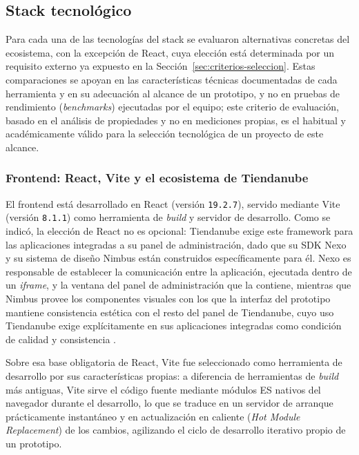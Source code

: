 \subsection{Stack tecnológico}
\label{sec:stack-tecnologico}

Para cada una de las tecnologías del stack se evaluaron alternativas concretas del ecosistema, con la excepción de React, cuya elección está determinada por un requisito externo ya expuesto en la Sección~\ref{sec:criterios-seleccion}. Estas comparaciones se apoyan en las características técnicas documentadas de cada herramienta y en su adecuación al alcance de un prototipo, y no en pruebas de rendimiento (\emph{benchmarks}) ejecutadas por el equipo; este criterio de evaluación, basado en el análisis de propiedades y no en mediciones propias, es el habitual y académicamente válido para la selección tecnológica de un proyecto de este alcance.

\subsubsection{Frontend: React, Vite y el ecosistema de Tiendanube}
\label{sec:frontend-react-vite}

El frontend está desarrollado en React (versión \texttt{19.2.7}), servido mediante Vite (versión \texttt{8.1.1}) como herramienta de \emph{build} y servidor de desarrollo. Como se indicó, la elección de React no es opcional: Tiendanube exige este framework para las aplicaciones integradas a su panel de administración, dado que su SDK Nexo y su sistema de diseño Nimbus están construidos específicamente para él. Nexo es responsable de establecer la comunicación entre la aplicación, ejecutada dentro de un \emph{iframe}, y la ventana del panel de administración que la contiene, mientras que Nimbus provee los componentes visuales con los que la interfaz del prototipo mantiene consistencia estética con el resto del panel de Tiendanube, cuyo uso Tiendanube exige explícitamente en sus aplicaciones integradas como condición de calidad y consistencia \parencite{TiendanubeAPI2024}.

Sobre esa base obligatoria de React, Vite fue seleccionado como herramienta de desarrollo por sus características propias: a diferencia de herramientas de \emph{build} más antiguas, Vite sirve el código fuente mediante módulos ES nativos del navegador durante el desarrollo, lo que se traduce en un servidor de arranque prácticamente instantáneo y en actualización en caliente (\emph{Hot Module Replacement}) de los cambios, agilizando el ciclo de desarrollo iterativo propio de un prototipo.

